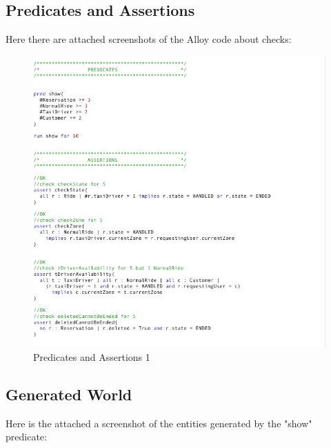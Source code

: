 		\subsection{Predicates and Assertions}
		Here there are attached screenshots of the Alloy code about checks:

				\begin{figure}[H]
					\centering
					\includegraphics[width=\textwidth, scale=0.5]{IMG/ALLOY/PREN_ASS.png}
					\caption{Predicates and Assertions 1}\label{sec:FigureSignatures1}
				\end{figure}

		\subsection{Generated World}
		Here is the attached a screenshot of the entities generated by the "show" predicate:

